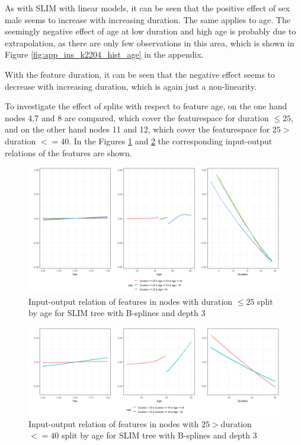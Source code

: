 As with SLIM with linear models, it can be seen that the positive effect of sex male seems to increase with increasing duration. The same applies to age. The seemingly negative effect of age at low duration and high age is probably due to extrapolation, as there are only
few observations in this area, which is shown in Figure \ref{fig:app_ins_k2204_hist_age} in the appendix.



With the feature duration, it can be seen that the negative effect seems to decrease with increasing duration, which is again just a non-linearity.

To investigate the effect of splits with respect to feature age, on the one hand nodes 4,7 and 8 are compared, which cover the featurespace for duration $\leq 25$, and on the other hand nodes 11 and 12, which cover the featurespace for $25 > $duration $<= 40$. In the Figures \ref{fig:ins_k2204_effects_age_low_duration} and \ref{fig:ins_k2204_effects_age_medium_duration} the corresponding input-output relations of the features are shown.

\begin{figure}[!htb]
    \centering    
    \includegraphics[width = 16cm]{Figures/insurance_use_case/k2204_BPV/effects_age_low_duration.png}
    \caption{Input-output relation of features in nodes with duration $\leq 25$ split by age for SLIM tree with B-splines and depth 3}
    \label{fig:ins_k2204_effects_age_low_duration}
\end{figure}

\begin{figure}[!htb]
    \centering    
    \includegraphics[width = 16cm]{Figures/insurance_use_case/k2204_BPV/effects_age_medium_duration.png}
    \caption{Input-output relation of features in nodes with $25 > $duration $<= 40$ split by age for SLIM tree with B-splines and depth 3}
    \label{fig:ins_k2204_effects_age_medium_duration}
\end{figure}

